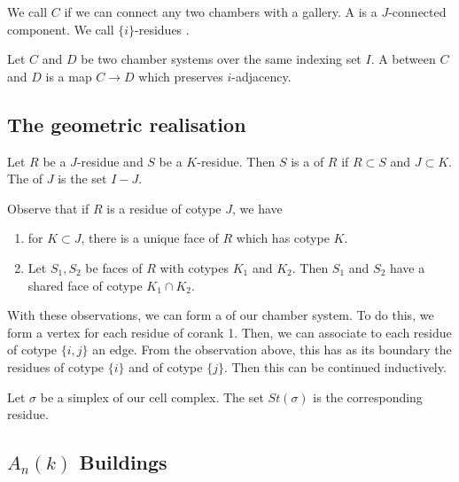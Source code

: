 \documentclass[11pt]{article}
\begin{document}
\begin{definition}
    We call $C$  if we can connect any two chambers with a gallery. A  is a $J$-connected component. We call $\{i\}$-residues . 
\end{definition}


\begin{definition}
    Let $C$ and $D$ be two chamber systems over the same indexing set $I$. A  between $C$ and $D$ is a map $C\longrightarrow D$ which preserves $i$-adjacency.
\end{definition}

\subsection{The geometric realisation}

\begin{definition}
    Let $R$ be a $J$-residue and $S$ be a $K$-residue. Then $S$ is a  of $R$ if $R\subset S$ and $J\subset K$. The  of $J$ is the set $I-J$. 
\end{definition}


Observe that if $R$ is a residue of cotype $J$, we have
\begin{enumerate}
    \item for $K\subset J$, there is a unique face of $R$ which has cotype $K$.
    \item Let $S_1,S_2$ be faces of $R$ with cotypes $K_1$ and $K_2$. Then $S_1$ and $S_2$ have a shared face of cotype $K_1\cap K_2$. 
\end{enumerate}


With these observations, we can form a  of our chamber system. To do this, we form a vertex for each residue of corank 1. Then, we can associate to each residue of cotype $\{i,j\}$ an edge. From the observation above, this has as its boundary the residues of cotype $\{i\}$ and of cotype $\{j\}$. Then this can be continued inductively. 

\begin{definition}
    Let $\sigma$ be a simplex of our cell complex. The set  $St(\sigma)$ is the corresponding residue. 
\end{definition}


\subsection{$A_n(k)$ Buildings}
\end{document}
